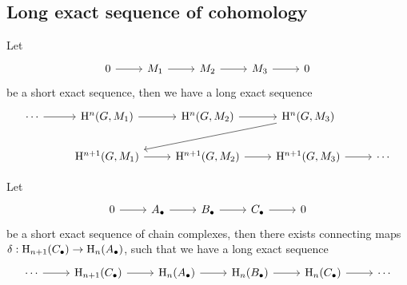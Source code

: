 \documentclass{article}
\begin{document}
\subsection{Long exact sequence of cohomology}

\begin{proposition}
    \label{prop:les-cohomology}
    Let
\[\begin{tikzcd}
	0 & {M_1} & {M_2} & {M_3} & 0
	\arrow[from=1-1, to=1-2]
	\arrow[from=1-2, to=1-3]
	\arrow[from=1-3, to=1-4]
	\arrow[from=1-4, to=1-5]
\end{tikzcd}\]
    be a short exact sequence, then we have a long exact sequence
\[\begin{tikzcd}
	\cdots & {\HH^n(G, M_1)} & {\HH^n(G, M_2)} & {\HH^n(G, M_3)} \\
	& {\HH^{n+1}(G, M_1)} & {\HH^{n+1}(G, M_2)} & {\HH^{n+1}(G, M_3)} & \cdots
	\arrow[from=1-1, to=1-2]
	\arrow[from=1-2, to=1-3]
	\arrow[from=1-3, to=1-4]
	\arrow[from=1-4, to=2-2]
	\arrow[from=2-2, to=2-3]
	\arrow[from=2-3, to=2-4]
	\arrow[from=2-4, to=2-5]
\end{tikzcd}\]
\end{proposition}

\begin{lemma}
    [snake]
    Let
    \[\begin{tikzcd}
        0 & {A_\bullet} & {B_\bullet} & {C_\bullet} & 0
        \arrow[from=1-1, to=1-2]
        \arrow[from=1-2, to=1-3]
        \arrow[from=1-3, to=1-4]
        \arrow[from=1-4, to=1-5]
    \end{tikzcd}\]
    be a short exact sequence of chain complexes, then there exists connecting maps \(\delta : \mathrm{H}_{n+1}(C_\bullet) \to \mathrm{H}_n(A_\bullet)\), such that we have a long exact sequence
    \[\begin{tikzcd}
        \cdots & {\HH_{n+1}(C_\bullet)} & {\HH_n(A_\bullet)} & {\HH_n(B_\bullet)} & {\HH_n(C_\bullet)} & \cdots
        \arrow[from=1-1, to=1-2]
        \arrow[from=1-2, to=1-3]
        \arrow[from=1-3, to=1-4]
        \arrow[from=1-4, to=1-5]
        \arrow[from=1-5, to=1-6]
    \end{tikzcd}\]
\end{lemma}
\end{document}
